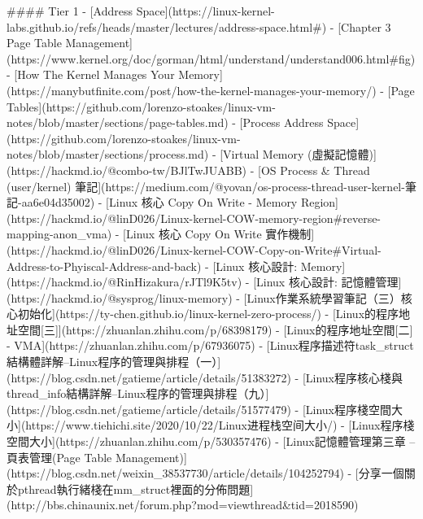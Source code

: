 \documentclass[]{article}
\begin{document}
\begin{markdown}
#### Tier 1
- [Address Space](https://linux-kernel-labs.github.io/refs/heads/master/lectures/address-space.html#)
- [Chapter 3  Page Table Management](https://www.kernel.org/doc/gorman/html/understand/understand006.html#fig)
- [How The Kernel Manages Your Memory](https://manybutfinite.com/post/how-the-kernel-manages-your-memory/)
- [Page Tables](https://github.com/lorenzo-stoakes/linux-vm-notes/blob/master/sections/page-tables.md)
- [Process Address Space](https://github.com/lorenzo-stoakes/linux-vm-notes/blob/master/sections/process.md)
- [Virtual Memory (虛擬記憶體)](https://hackmd.io/@combo-tw/BJlTwJUABB)
- [OS Process & Thread (user/kernel) 筆記](https://medium.com/@yovan/os-process-thread-user-kernel-筆記-aa6e04d35002)
- [Linux 核心 Copy On Write - Memory Region](https://hackmd.io/@linD026/Linux-kernel-COW-memory-region#reverse-mapping-anon_vma)
- [Linux 核心 Copy On Write 實作機制](https://hackmd.io/@linD026/Linux-kernel-COW-Copy-on-Write#Virtual-Address-to-Phyiscal-Address-and-back)
- [Linux 核心設計: Memory](https://hackmd.io/@RinHizakura/rJTl9K5tv)
- [Linux 核心設計: 記憶體管理](https://hackmd.io/@sysprog/linux-memory)
- [Linux作業系統學習筆記（三）核心初始化](https://ty-chen.github.io/linux-kernel-zero-process/)
- [Linux的程序地址空間[三]](https://zhuanlan.zhihu.com/p/68398179)
- [Linux的程序地址空間[二] - VMA](https://zhuanlan.zhihu.com/p/67936075)
- [Linux程序描述符task_struct結構體詳解--Linux程序的管理與排程（一）](https://blog.csdn.net/gatieme/article/details/51383272)
- [Linux程序核心棧與thread_info結構詳解--Linux程序的管理與排程（九）](https://blog.csdn.net/gatieme/article/details/51577479)
- [Linux程序棧空間大小](https://www.tiehichi.site/2020/10/22/Linux进程栈空间大小/)
- [Linux程序棧空間大小](https://zhuanlan.zhihu.com/p/530357476)
- [Linux記憶體管理第三章 -- 頁表管理(Page Table Management)](https://blog.csdn.net/weixin_38537730/article/details/104252794)
- [分享一個關於pthread執行緒棧在mm_struct裡面的分佈問題](http://bbs.chinaunix.net/forum.php?mod=viewthread&tid=2018590)


\end{markdown}
\end{document}
